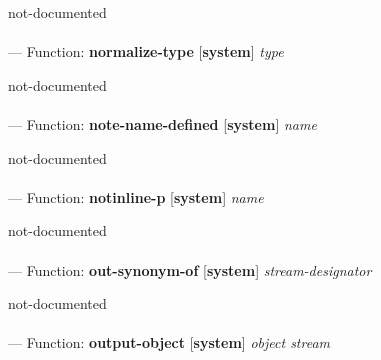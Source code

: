 \begin{adjustwidth}{5em}{5em}
not-documented
\end{adjustwidth}

\paragraph{}
\label{SYSTEM:NORMALIZE-TYPE}
--- Function: \textbf{normalize-type} [\textbf{system}] \textit{type}

\begin{adjustwidth}{5em}{5em}
not-documented
\end{adjustwidth}

\paragraph{}
\label{SYSTEM:NOTE-NAME-DEFINED}
--- Function: \textbf{note-name-defined} [\textbf{system}] \textit{name}

\begin{adjustwidth}{5em}{5em}
not-documented
\end{adjustwidth}

\paragraph{}
\label{SYSTEM:NOTINLINE-P}
--- Function: \textbf{notinline-p} [\textbf{system}] \textit{name}

\begin{adjustwidth}{5em}{5em}
not-documented
\end{adjustwidth}

\paragraph{}
\label{SYSTEM:OUT-SYNONYM-OF}
--- Function: \textbf{out-synonym-of} [\textbf{system}] \textit{stream-designator}

\begin{adjustwidth}{5em}{5em}
not-documented
\end{adjustwidth}

\paragraph{}
\label{SYSTEM:OUTPUT-OBJECT}
--- Function: \textbf{output-object} [\textbf{system}] \textit{object stream}

